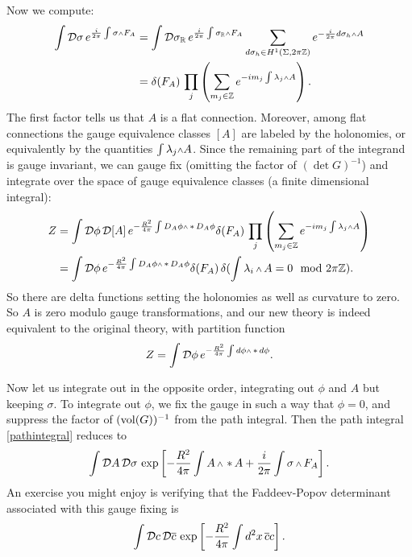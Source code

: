 Now we compute:
\begin{equation}
\begin{align}
\int\cD\sigma\, e^{\frac{i}{2\pi}\int\sigma\wdg F_A}
&=\int \cD\sigma_{\IR}\,e^{\frac{i}{2\pi} \int \sigma_{\IR}\wdg F_A}
\sum_{d\sigma_h\in H^1(\Sigma,2\pi\IZ)}e^{-\frac{i}{2\pi}d\sigma_h\wdg A}
\\&= \delta(F_A)\,\prod_j\left(\sum_{m_j\in\IZ} e^{-i
m_j\int\lambda_j\wdg A}\right).
\end{align}
\end{equation}
The first factor tells us that $A$ is a flat connection.  Moreover, among
flat connections the gauge equivalence classes $[A]$ are labeled by the
holonomies,
or equivalently by the quantities $\int \lambda_j\wdg A$.  Since the
remaining part of the integrand is gauge invariant, we can gauge fix (omitting
the
factor of $(\det G)^{-1}$) and
integrate over the space of gauge equivalence classes (a finite dimensional
integral):
\begin{equation}
\begin{align}
Z&=\int\cD\phi\,\cD[A]\,e^{-\frac{R^2}{4\pi}\int D_A\phi\wdg\hstar D_A\phi}
\delta(F_A)\,\prod_j\left(\sum_{m_j\in\IZ} e^{-i
m_j\int\lambda_j\wdg A}\right)
\\&=\int\cD\phi\,e^{-\frac{R^2}{4\pi}\int D_A\phi\wdg\hstar D_A\phi}
\delta(F_A)\,\delta(\int \lambda_i\wdg A=0\mod 2\pi\IZ).
\end{align}
\end{equation}
So there are delta functions setting the holonomies as well
as curvature to zero.
So $A$ is zero modulo gauge transformations, and our new theory
is indeed equivalent to the original theory, with partition function
\begin{equation}
Z=\int\cD\phi\,e^{-\frac{R^2}{4\pi}\int d\phi\wdg\hstar d\phi}.
\end{equation}


Now let us integrate out in the opposite order, integrating out $\phi$ and $A$
but keeping $\sigma$.  To integrate out $\phi$, we fix the gauge in such a
way that
$\phi=0$, and suppress the factor of $(\operatorname{\rm vol}(G))^{-1}$ from the path integral.
Then the path integral \eqref{pathintegral} reduces to
\begin{equation}
\int \cD A\,\cD\sigma\,\exp\left[
-\frac{R^2}{4\pi}\int A\wdg\hstar A
+ \frac{i}{2\pi}\int\sigma \wdg F_A
\right].
\end{equation}
An exercise you might enjoy is verifying that the Faddeev-Popov determinant
associated with this gauge fixing is
\begin{equation}
\int{\cal D} c\,{\cal D}\overline{c}\,\exp\left[-\frac{R^2}{4\pi}\int d^2x\,
\overline{c}c \right].
\end{equation}


